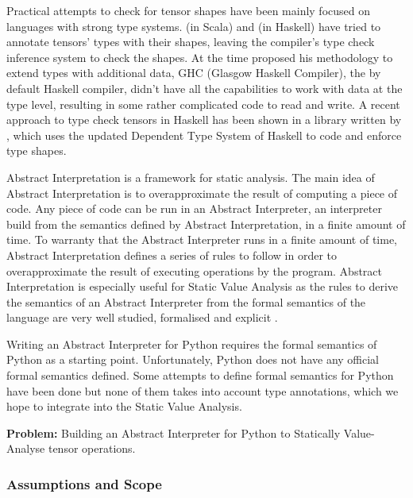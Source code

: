 Practical attempts to check for tensor shapes have been mainly focused on languages with strong
type systems. \textcite{chen_typesafe_2017} (in Scala) and
\textcite{eaton_statically_2006} (in Haskell) have tried to annotate tensors' types with
their shapes, leaving the compiler's type check inference system to check the shapes. At
the time \textcite{eaton_statically_2006} proposed his methodology to extend types with
additional data, GHC (Glasgow Haskell Compiler), the by default Haskell compiler, didn't
have all the capabilities to work with data at the type level, resulting in some rather
complicated code to read and write. A recent approach to type check tensors in Haskell has
been shown in a library written by \textcite{elkin_haskell_2018}, which uses the updated
Dependent Type System of Haskell to code and enforce type shapes.

Abstract Interpretation is a framework for static analysis. The main idea of Abstract
Interpretation is to overapproximate the result of computing a piece of code. Any piece of
code can be run in an Abstract Interpreter, an interpreter build from the semantics
defined by Abstract Interpretation, in a finite amount of time. To warranty that the
Abstract Interpreter runs in a finite amount of time, Abstract Interpretation defines a
series of rules to follow in order to overapproximate the result of executing operations by the
program. Abstract Interpretation is especially useful for Static Value Analysis as the
rules to derive the semantics of an Abstract Interpreter from the formal semantics of the
language are very well studied, formalised and explicit \autocite{cousot_abstract_1977}.

Writing an Abstract Interpreter for Python requires the formal semantics of Python as a
starting point. Unfortunately, Python does not have any official formal semantics defined.
Some attempts to define formal semantics for Python have been done
\autocites{politz_python_2013}{fromherz_static_2018}{guth_formal_2013}{ranson_semantics_2008}
but none of them takes into account type annotations, which we hope to integrate into the
Static Value Analysis.

\textbf{Problem:} Building an Abstract Interpreter for Python to Statically Value-Analyse
tensor operations.


\subsubsection*{Assumptions and Scope}

